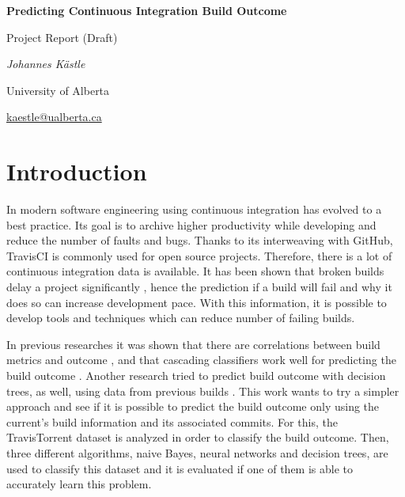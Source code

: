 \documentclass[a4paper,11pt]{article}
\begin{document}
	
	\begin{center}
	{\huge\bfseries Predicting Continuous Integration Build Outcome \par}
	{\Large Project Report (Draft)\par}
	
	\vspace{1cm}
	{\Large\itshape Johannes Kästle\par}
	{ University of Alberta \par}
	\href{mailto:kaestle@ualberta.ca}{kaestle@ualberta.ca}
	\end{center}


\setlength{\parindent}{0pt}
\setlength{\parskip}{1.5ex plus0.5ex minus0.5ex}

\begin{abstract}
	In order to improve developers productivity and increase development pace, it is tried to predict the outcome of continuous integration builds. For that, $2,500,756$ builds with $37$ features were analyzed, using three different machine learning algorithms with over $700$ configurations. Generally, all classifiers struggled with predicting failures, but had high sensitivity. At the end, the decision tree classifier could predict the outcome with an accuracy of $76\%$ and performed significantly better than its competitors. 
\end{abstract}

\section{Introduction}

In modern software engineering using continuous integration has evolved to a best practice. Its goal is to archive higher productivity while developing and reduce the number of faults and bugs. Thanks to its interweaving with GitHub, TravisCI is commonly used for open source projects. Therefore, there is a lot of continuous integration data is available. It has been shown that broken builds delay a project significantly \cite{CIDelay}, hence the prediction if a build will fail and why it does so can increase development pace. With this information, it is possible to develop tools and techniques which can reduce number of failing builds. 

In previous researches it was shown that there are correlations between build metrics and outcome \cite{correlation}, and that cascading classifiers work well for predicting the build outcome \cite{cascade}. Another research tried to predict build outcome with decision trees, as well, using data from previous builds \cite{treeTimes}. This work wants to try a simpler approach and see if it is possible to predict the build outcome only using the current's build information and its associated commits. For this, the TravisTorrent \cite{msr17challenge} dataset is analyzed in order to classify the build outcome. Then, three different algorithms, naive Bayes, neural networks and decision trees, are used to classify this dataset and it is evaluated if one of them is able to accurately learn this problem. 
\end{document}
